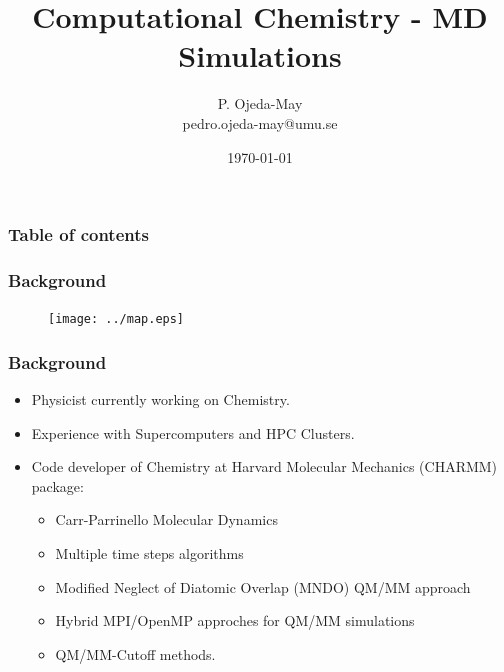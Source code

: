 \documentclass{beamer}
\begin{document}

\title{Computational Chemistry - MD Simulations} \author{P. Ojeda-May \\{\small pedro.ojeda-may@umu.se}} 

\date{\today}


\begin{frame}
\titlepage
\end{frame}

\begin{frame}\frametitle{Table of contents}\tableofcontents \end{frame}

\begin{frame}\frametitle{Background }

\begin{figure}
\texttt{[image: ../map.eps]}
\end{figure}

\end{frame}

\begin{frame}\frametitle{Background  }

\begin{itemize}
\item<1-> Physicist currently working on Chemistry.

\item<2-> Experience with Supercomputers and HPC Clusters. 

\item<3-> Code developer of Chemistry at Harvard Molecular Mechanics (CHARMM) package:  

	\begin{itemize}
		\item Carr-Parrinello Molecular Dynamics
		\item Multiple time steps algorithms
		\item Modified Neglect of Diatomic Overlap (MNDO) QM/MM approach
		\item Hybrid MPI/OpenMP approches for QM/MM simulations
		\item QM/MM-Cutoff methods.
	\end{itemize}
\end{itemize}


\end{frame}
\end{document}
